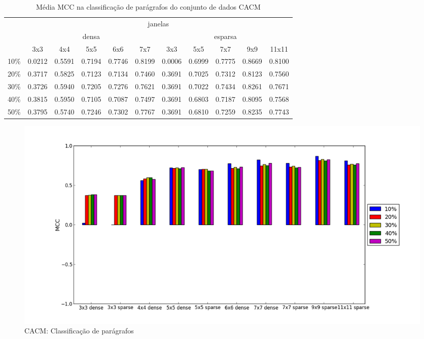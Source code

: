 \documentclass[a4paper,11pt]{article}
\begin{document}
  \begin{center}
    \begin{table}[p]
      \caption{Média MCC na classificação de parágrafos do conjunto de dados CACM}
      \begin{tabular}{ l | c c c c c || c c c c c | }
        \cline{2-11}
        & \multicolumn{10}{|c|}{janelas} \\
        \cline{2-11}
        & \multicolumn{5}{c||}{densa} & \multicolumn{5}{c|}{esparsa} \\
        \cline{2-11}
        & 3x3 & 4x4 & 5x5 & 6x6 & 7x7 & 3x3 & 5x5 & 7x7 & 9x9 & 11x11 \\
        \hline
        \multicolumn{1}{|l|}{10\%}& 0.0212& 0.5591& 0.7194& 0.7746& 0.8199& 0.0006& 0.6999& 0.7775& 0.8669& 0.8100\\
        \multicolumn{1}{|l|}{20\%}& 0.3717& 0.5825& 0.7123& 0.7134& 0.7460& 0.3691& 0.7025& 0.7312& 0.8123& 0.7560\\
        \multicolumn{1}{|l|}{30\%}& 0.3726& 0.5940& 0.7205& 0.7276& 0.7621& 0.3691& 0.7022& 0.7434& 0.8261& 0.7671\\
        \multicolumn{1}{|l|}{40\%}& 0.3815& 0.5950& 0.7105& 0.7087& 0.7497& 0.3691& 0.6803& 0.7187& 0.8095& 0.7568\\
        \multicolumn{1}{|l|}{50\%}& 0.3795& 0.5740& 0.7246& 0.7302& 0.7767& 0.3691& 0.6810& 0.7259& 0.8235& 0.7743\\
        \hline  
      \end{tabular}
      \label{tab:cacm_mcc_paragraph}
    \end{table}
  \end{center}

  \begin{figure}[p]
    \centerline{\includegraphics[width=1.2\textwidth]{assets/experiment_charts/cacm_TextRegion_paragraph_mcc.png}}
    \caption{CACM: Classificação de parágrafos}
    \label{fig:cacm_TextRegion_paragraph_mcc}
  \end{figure}
\end{document}
